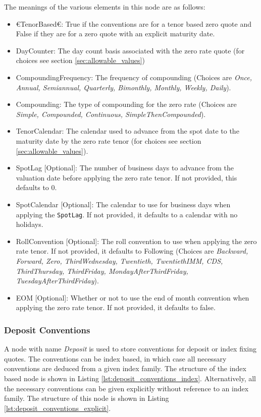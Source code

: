 The meanings of the various elements in this node are as follows:
\begin{itemize}
\item €TenorBased€: True if the conventions are for a tenor based zero quote and False if they are
for a zero quote with an explicit maturity date.
\item DayCounter: The day count basis associated with the zero rate quote (for choices see section
\ref{sec:allowable_values})
\item CompoundingFrequency: The frequency of compounding (Choices are {\em Once, Annual, Semiannual, Quarterly,
Bimonthly, Monthly, Weekly, Daily}).
\item Compounding: The type of compounding for the zero rate (Choices are {\em Simple, Compounded, Continuous,
SimpleThenCompounded}).
\item TenorCalendar: The calendar used to advance from the spot date to the maturity date by the zero rate tenor (for
choices see section \ref{sec:allowable_values}).
\item SpotLag [Optional]: The number of business days to advance from the valuation date before applying the zero rate
tenor. If not provided, this defaults to 0.
\item SpotCalendar [Optional]: The calendar to use for business days when applying the \lstinline!SpotLag!. If not
provided, it defaults to a calendar with no holidays.
\item RollConvention [Optional]: The roll convention to use when applying the zero rate tenor. If not provided, it
defaults to Following (Choices are {\em Backward, Forward, Zero, ThirdWednesday, Twentieth, TwentiethIMM, CDS, ThirdThursday, ThirdFriday, MondayAfterThirdFriday, TuesdayAfterThirdFriday}).
\item EOM [Optional]: Whether or not to use the end of month convention when applying the zero rate tenor. If not
provided, it defaults to false.
\end{itemize}

\subsubsection{Deposit Conventions}

A node with name \emph{Deposit} is used to store conventions for deposit or index fixing quotes. The conventions can be
index based, in which case all necessary conventions are deduced from a given index family. The structure of the index
based node is shown in Listing \ref{lst:deposit_conventions_index}. Alternatively, all the necessary conventions can be
given explicitly without reference to an index family. The structure of this node is shown in Listing
\ref{lst:deposit_conventions_explicit}.

